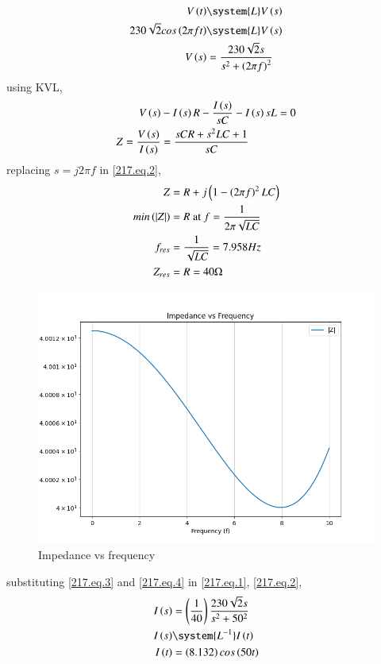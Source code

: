 \documentclass[journal,12pt,twocolumn]{IEEEtran}
\begin{document}
\begin{align}
    V\brak{t} &\system{L} V\brak{s}\\
    230\sqrt{2} cos\brak{2\pi f t} &\system{L} V\brak{s}\\
    V\brak{s} & = \frac{230\sqrt{2}s}{s^2 + \brak{2\pi f}^2}\label{217.eq.1}
\end{align}
using KVL, 
\begin{align}
    V\left(s\right) & - I\left(s\right) R - \frac{I\left(s\right)}{sC} - I\left(s\right)sL = 0\\
    Z = \frac{V\left(s\right)}{I\left(s\right)} & = \frac{sCR + s^2LC + 1}{sC}\label{217.eq.2}
\end{align}
replacing $s = j2\pi f$ in \eqref{217.eq.2},
\begin{align}
    Z & = R + j\left(1-\left(2\pi f\right)^2LC\right)\\
    min\left(|Z|\right) & = R \text{ at } f = \frac{1}{2\pi\sqrt{LC}}\\ 
    f_{res} & = \frac{1}{\sqrt{LC}} = 7.958 Hz\label{217.eq.3}\\
    Z_{res} & = R = 40 \Omega\label{217.eq.4}
\end{align}
\begin{figure}[h]
    \centering
	\includegraphics[width=\columnwidth]{figs/impedance.png}
    \caption{Impedance vs frequency}
    \label{217.fig.3}
\end{figure}
substituting \eqref{217.eq.3} and \eqref{217.eq.4} in \eqref{217.eq.1}, \eqref{217.eq.2},
\begin{align}
    I\brak{s} & = \brak{\frac{1}{40}}\frac{230\sqrt{2}s}{s^2 + 50^2}\label{217.eq.6}\\
    I\brak{s} & \system{L^{-1}} I\brak{t}\\
    I\brak{t} & = \brak{8.132} cos\brak{50 t} \label{217.eq.5}
\end{align}
\end{document}
